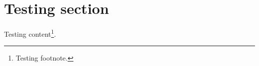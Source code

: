 \documentclass{article}
\begin{document}
\section{Testing section}

Testing content\footnote{Testing footnote.}.
\end{document}
